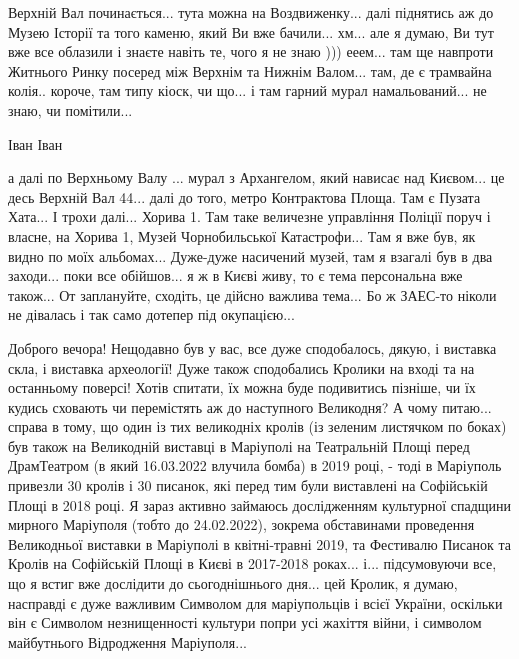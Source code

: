 Верхній Вал починається... тута можна на Воздвиженку... далі піднятись аж до
Музею Історії та того каменю, який Ви вже бачили... хм... але я думаю, Ви тут
вже все облазили і знаєте навіть те, чого я не знаю ))) ееем... там ще навпроти
Житнього Ринку посеред між Верхнім та Нижнім Валом... там, де є трамвайна
колія.. короче, там типу кіоск, чи що... і там гарний мурал намальований... не
знаю, чи помітили...

Іван Іван

а далі по Верхньому Валу ... мурал з Архангелом, який нависає над Києвом... це
десь Верхній Вал 44... далі до того, метро Контрактова Площа. Там є Пузата
Хата... І трохи далі... Хорива 1. Там таке величезне управління Поліції поруч і
власне, на Хорива 1, Музей Чорнобильської Катастрофи... Там я вже був, як видно
по моїх альбомах... Дуже-дуже насичений музей, там я взагалі був в два
заходи... поки все обійшов... я ж в Києві живу, то є тема персональна вже
також... От заплануйте, сходіть, це дійсно важлива тема... Бо ж ЗАЕС-то ніколи
не дівалась і так само дотепер під окупацією...

Доброго вечора! Нещодавно був у вас, все дуже сподобалось, дякую, і виставка
скла, і виставка археології! Дуже також сподобались Кролики на вході та на
останньому поверсі! Хотів спитати, їх можна буде подивитись пізніше, чи їх
кудись сховають чи перемістять аж до наступного Великодня? А чому питаю...
справа в тому, що один із тих великодніх кролів (із зеленим листячком по боках)
був також на Великодній виставці в Маріуполі на Театральній Площі перед
ДрамТеатром (в який 16.03.2022 влучила бомба) в 2019 році, - тоді в Маріуполь
привезли 30 кролів і 30 писанок, які перед тим були виставлені на Софійській
Площі в 2018 році. Я зараз активно займаюсь дослідженням культурної спадщини
мирного Маріуполя (тобто до 24.02.2022), зокрема обставинами проведення
Великодньої виставки в Маріуполі в квітні-травні 2019, та Фестивалю Писанок та
Кролів на Софійській Площі в Києві в 2017-2018 роках... і... підсумовуючи все,
що я встиг вже дослідити до сьогоднішнього дня... цей Кролик, я думаю,
насправді є дуже важливим Символом для маріупольців і всієї України, оскільки
він є Символом незнищенності культури попри усі жахіття війни, і символом
майбутнього Відродження Маріуполя...

